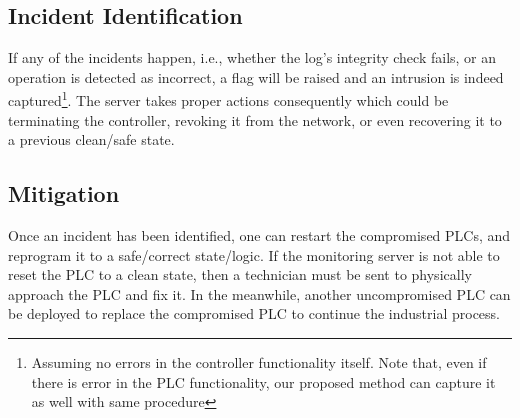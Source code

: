 \subsection{Incident Identification}

If any of the incidents happen, i.e., whether the log's integrity check fails, or an operation is detected as incorrect, a flag will be raised and an intrusion is indeed captured\footnote{Assuming no errors in the controller functionality itself. Note that, even if there is error in the PLC functionality, our proposed method can capture it as well with same procedure}. The server takes proper actions consequently which could be terminating the controller, revoking it from the network, or even recovering it to a previous clean/safe state.

%


\subsection{Mitigation}

Once an incident has been identified, one can restart the compromised PLCs, and reprogram it to a safe/correct state/logic. If the monitoring server is not able to reset the PLC to a clean state, then a technician must be sent to physically approach the PLC and fix it. In the meanwhile, another uncompromised PLC can be deployed to replace the compromised PLC to continue the industrial process. 